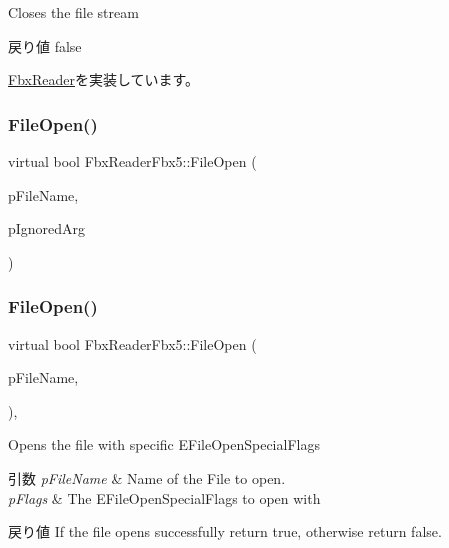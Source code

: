 Closes the file stream \begin{DoxyReturn}{戻り値}
{\ttfamily false} 
\end{DoxyReturn}


\hyperlink{class_fbx_reader_a327df94e5c24315fc5cbcedf0e7bb615}{Fbx\+Reader}を実装しています。

\mbox{\label{class_fbx_reader_fbx5_afabd2457815a65017943a48fb0d0b3bc}} 
\subsubsection{\texorpdfstring{File\+Open()}{FileOpen()}\hspace{0.1cm}{\footnotesize\ttfamily [1/5]}}
{\footnotesize\ttfamily virtual bool Fbx\+Reader\+Fbx5\+::\+File\+Open (\begin{DoxyParamCaption}\item[{char $\ast$}]{p\+File\+Name,  }\item[{bool}]{p\+Ignored\+Arg }\end{DoxyParamCaption})\hspace{0.3cm}{\ttfamily [virtual]}}

\mbox{\label{class_fbx_reader_fbx5_aa197089a894684834388a2caf43145e3}} 
\subsubsection{\texorpdfstring{File\+Open()}{FileOpen()}\hspace{0.1cm}{\footnotesize\ttfamily [2/5]}}
{\footnotesize\ttfamily virtual bool Fbx\+Reader\+Fbx5\+::\+File\+Open (\begin{DoxyParamCaption}\item[{char $\ast$}]{p\+File\+Name,  }\item[{\hyperlink{class_fbx_reader_a1a14bd907bcda7dd48ba9b0a6236b7b8}{E\+File\+Open\+Special\+Flags}}]{ }\end{DoxyParamCaption})\hspace{0.3cm}{\ttfamily [inline]}, {\ttfamily [virtual]}}

Opens the file with specific E\+File\+Open\+Special\+Flags 
\begin{DoxyParams}{引数}
{\em p\+File\+Name} & Name of the File to open. \\
\hline
{\em p\+Flags} & The E\+File\+Open\+Special\+Flags to open with \\
\hline
\end{DoxyParams}
\begin{DoxyReturn}{戻り値}
If the file opens successfully return true, otherwise return false. 
\end{DoxyReturn}


